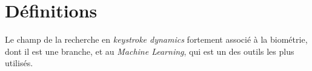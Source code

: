 \section{Définitions}

Le champ de la recherche en \textit{keystroke dynamics} fortement associé à la biométrie, dont il est une branche, et au \textit{Machine Learning}, qui est un des outils les plus utilisés. \\



